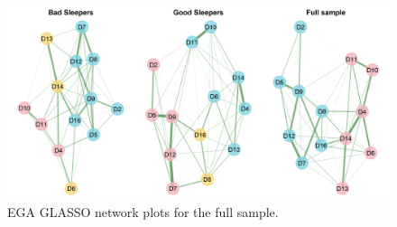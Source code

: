 \documentclass[
  12pt,
  twoside,
  openright,
  a4paper,
  chapter=TITLE,
  section=TITLE,
  brazil]{abntex2}
\begin{document}
\begin{figure}

{\centering \includegraphics{img/fs-plots-1.png}

}

\caption{\label{fig-fs-plots}EGA GLASSO network plots for the full
sample.}

\end{figure}
\end{document}

